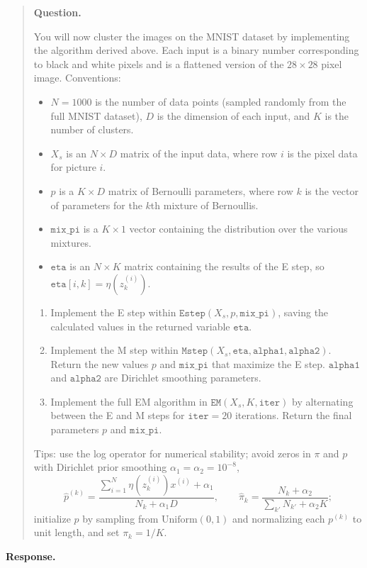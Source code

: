\documentclass[11pt]{article}
\newenvironment{question}{%
  \par\addvspace{0.8em}%
  \begin{quote}\small
  \noindent\textbf{Question.}\enspace\ignorespaces
}{%
  \end{quote}%
  \par\nopagebreak
  \noindent\textbf{Response.}\par\nopagebreak\smallskip
}
\begin{document}
\begin{question}
You will now cluster the images on the MNIST dataset by implementing the algorithm derived above. Each input is a binary number corresponding to black and white pixels and is a flattened version of the \(28\times 28\) pixel image. Conventions:
\begin{itemize}
  \item \(N=1000\) is the number of data points (sampled randomly from the full MNIST dataset), \(D\) is the dimension of each input, and \(K\) is the number of clusters.
  \item \(X_s\) is an \(N\times D\) matrix of the input data, where row \(i\) is the pixel data for picture \(i\).
  \item \(p\) is a \(K\times D\) matrix of Bernoulli parameters, where row \(k\) is the vector of parameters for the \(k\)th mixture of Bernoullis.
  \item \(\texttt{mix\_pi}\) is a \(K\times 1\) vector containing the distribution over the various mixtures.
  \item \(\texttt{eta}\) is an \(N\times K\) matrix containing the results of the E step, so \(\texttt{eta}[i,k]=\eta(z^{(i)}_k)\).
\end{itemize}
\begin{enumerate}
  \item[(a)] Implement the E step within \(\texttt{Estep}(X_s,p,\texttt{mix\_pi})\), saving the calculated values in the returned variable \(\texttt{eta}\).
  \item[(b)] Implement the M step within \(\texttt{Mstep}(X_s,\texttt{eta},\texttt{alpha1},\texttt{alpha2})\). Return the new values \(p\) and \(\texttt{mix\_pi}\) that maximize the E step. \(\texttt{alpha1}\) and \(\texttt{alpha2}\) are Dirichlet smoothing parameters.
  \item[(c)] Implement the full EM algorithm in \(\texttt{EM}(X_s,K,\texttt{iter})\) by alternating between the E and M steps for \(\texttt{iter}=20\) iterations. Return the final parameters \(p\) and \(\texttt{mix\_pi}\).
\end{enumerate}
Tips: use the log operator for numerical stability; avoid zeros in \(\pi\) and \(p\) with Dirichlet prior smoothing \(\alpha_1=\alpha_2=10^{-8}\),
\[
  \hat p^{(k)}
  =\frac{\sum_{i=1}^N\eta(z^{(i)}_k)x^{(i)}+\alpha_1}{N_k+\alpha_1 D},
  \qquad
  \hat\pi_k
  =\frac{N_k+\alpha_2}{\sum_{k'}N_{k'}+\alpha_2 K};
\]
initialize \(p\) by sampling from \(\mathrm{Uniform}(0,1)\) and normalizing each \(p^{(k)}\) to unit length, and set \(\pi_k=1/K\).

\end{question}
\end{document}
